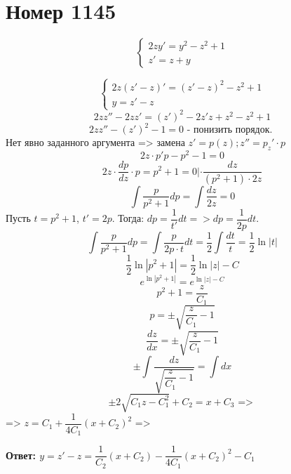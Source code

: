 \section*{Номер 1145}
$$ \begin{cases}
        2zy' = y^2 - z^2 + 1 \\
        z' = z + y
    \end{cases} $$

\begin{solution}
    $$
        \begin{cases}
            2z(z' - z)' = (z' - z)^2 - z^2 + 1 \\
            y = z' - z
        \end{cases}
    $$
    $$ 2zz'' - 2zz' = (z')^2 - 2z'z + z^2 - z^2 + 1 $$
    $$ 2zz'' - (z')^2 - 1 = 0 \text{ - понизить порядок. } $$
    Нет явно заданного аргумента => замена $ z' = p(z); z'' = p_z'\cdot p $
    $$ 2z \cdot p'p - p^2 - 1 = 0 $$
    $$ 2z \cdot \dfrac{dp}{dz} \cdot p = p^2 + 1 = 0 | \cdot \dfrac{dz}{(p^2 + 1) \cdot 2z} $$
    $$ \int \dfrac{p}{p^2 + 1} dp = \int \dfrac{dz}{2z} = 0 $$
    Пусть $ t = p^2 + 1 $, $ t' = 2p $. Тогда: $ dp = \dfrac{1}{t'} dt => dp = \dfrac{1}{2p} dt $.
    $$ \int \dfrac{p}{p^2 + 1} dp = \int \dfrac{p}{2p \cdot t} dt = \dfrac{1}{2} \int \dfrac{dt}{t} = \dfrac{1}{2} \ln |t| $$
    $$ \dfrac{1}{2} \ln |p^2 + 1| = \dfrac{1}{2} \ln |z| - C $$
    $$ e^{\ln |p^2 + 1|} = e^{\ln |z| - C} $$
    $$ p^2 + 1 = \dfrac{z}{C_1} $$
    $$ p = \pm \sqrt{\dfrac{z}{C_1} - 1} $$
    $$ \dfrac{dz}{dx} = \pm \sqrt{\dfrac{z}{C_1} - 1} $$
    $$ \pm \int \dfrac{dz}{\sqrt{\dfrac{z}{C_1} - 1}} = \int dx $$
    $$ \pm 2 \sqrt{C_1 z - C_1^2} + C_2 = x + C_3 \text{ => } $$
    => $ z = C_1 + \dfrac{1}{4 C_1} (x + C_2)^2 $ => \par
    \textbf{Ответ: $ y = z' - z = \dfrac{1}{C_2} (x + C_2) - \dfrac{1}{4 C_1} (x + C_2)^2 - C_1 $}

\end{solution}\pagebreak